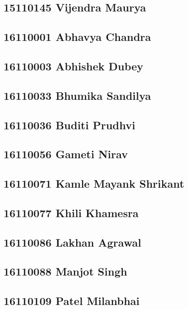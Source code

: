 \documentclass[journal=jpcbfk,manuscript=article]{achemso}
\begin{document}
\subsection {15110145	Vijendra Maurya}

\subsection {16110001	Abhavya Chandra}

\subsection {16110003	Abhishek Dubey}

\subsection {16110033	Bhumika Sandilya}

\subsection {16110036	Buditi Prudhvi}

\subsection {16110056	Gameti Nirav}

\subsection {16110071	Kamle Mayank Shrikant}

\subsection {16110077	Khili Khamesra}

\subsection {16110086	Lakhan Agrawal}

\subsection {16110088	Manjot Singh}

\subsection {16110109	Patel Milanbhai}
\end{document}
